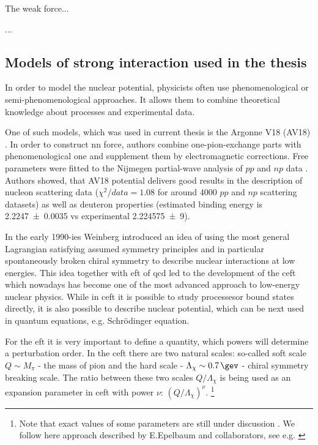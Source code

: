 The weak force...

...  

\subsection*{Models of strong interaction used in the thesis}

In order to model the nuclear potential, physicists often use phenomenological
or semi-phenomenological approaches. It allows them to combine
theoretical knowledge about processes and experimental data.

One of such models, which was used in current thesis is the Argonne V18 (AV18) \cite{AV18Wiringa}.
In order to construct \gls{nn} force, authors combine
one-pion-exchange parts
with phenomenological one and supplement them by electromagnetic corrections.
Free parameters were fitted to
the Nijmegen partial-wave analysis of $pp$ and $np$ data \cite{NijmegenPhysRevC.48.792}. 
Authors showed, that AV18 potential delivers good results
in the description of nucleon scattering data ($\chi ^2/data = 1.08$ for around \num{4000} $pp$ and $np$ scattering datasets) 
as well as deuteron properties (estimated binding energy is \SI{2.2247(35)}{\mev} vs experimental \SI{ 2.224 575(9)}{\mev}).


In the early 1990-ies Weinberg \cite{WEINBERG1990,WEINBERG1991} introduced 
an idea of using the most general Lagrangian
satisfying assumed symmetry principles and in particular
spontaneously broken chiral symmetry to 
describe nuclear interactions at low energies.
This idea together with \gls{eft} of \gls{qcd} 
led to the development of the \gls{ceft}
which nowadays has become one of the most advanced approach to
low-energy nuclear physics. While in \gls{ceft} it is possible to study processesor bound states directly,
it is also possible to describe nuclear potential, which can be next used in quantum equations,
e.g. Schr\"odinger equation.
 
For the \gls{eft} it is very important to 
define a quantity, which powers will determine a perturbation order.
In the \gls{ceft} there are two natural scales: so-called soft scale $Q \sim M_\pi$  -
the mass of pion and the hard scale -
$\Lambda_\chi \sim \SI{0.7}{\gev}$ - chiral symmetry breaking scale.
The ratio between these two scales $Q/\Lambda_\chi$
is being used as an expansion parameter in  \gls{ceft} with power
$\nu$: $\left(Q/\Lambda_\chi\right)^\nu$.
\footnote{Note that exact values of some parameters are still under discussion \cite{Epelbaum2004}. We follow here approach described by E.Epelbaum and collaborators, see e.g. \cite{reinkrebs2018}}


